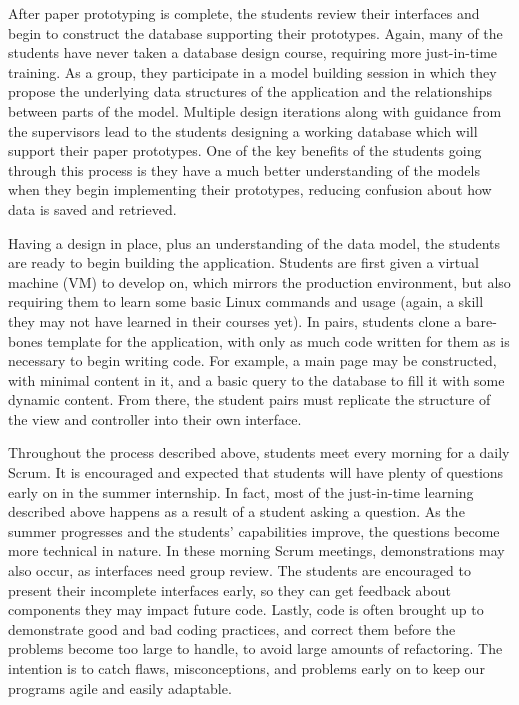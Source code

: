 After paper prototyping is complete, the students review their interfaces and begin to construct the database supporting their prototypes. Again, many of the students have never taken a database design course, requiring more just-in-time training. As a group, they participate in a model building session in which they propose the underlying data structures of the application and the relationships between parts of the model. Multiple design iterations along with guidance from the supervisors lead to the students designing a working database which will support their paper prototypes. One of the key benefits of the students going through this process is they have a much better understanding of the models when they begin implementing their prototypes, reducing confusion about how data is saved and retrieved. 

Having a design in place, plus an understanding of the data model, the students are ready to begin building the application. Students are first given a virtual machine (VM) to develop on, which mirrors the production environment, but also requiring them to learn some basic Linux commands and usage (again, a skill they may not have learned in their courses yet). In pairs, students clone a bare-bones template for the application, with only as much code written for them as is necessary to begin writing code. For example, a main page may be constructed, with minimal content in it, and a basic query to the database to fill it with some dynamic content. From there, the student pairs must replicate the structure of the view and controller into their own interface.

Throughout the process described above, students meet every morning for a daily Scrum. It is encouraged and expected that students will have plenty of questions early on in the summer internship. In fact, most of the just-in-time learning described above happens as a result of a student asking a question. As the summer progresses and the students' capabilities improve, the questions become more technical in nature. In these morning Scrum meetings, demonstrations may also occur, as interfaces need group review. The students are encouraged to present their incomplete interfaces early, so they can get feedback about components they may impact future code. Lastly, code is often brought up to demonstrate good and bad coding practices, and correct them before the problems become too large to handle, to avoid large amounts of refactoring. The intention is to catch flaws, misconceptions, and problems early on to keep our programs agile and easily adaptable.
 
